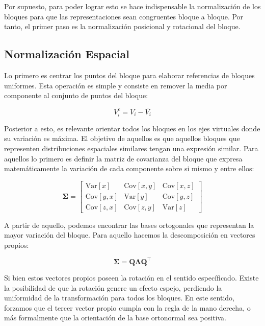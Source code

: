     Por supuesto, para poder lograr esto se hace indispensable la normalización de los bloques para que las representaciones sean congruentes bloque a bloque. Por tanto, el primer paso es la normalización posicional y rotacional del bloque.

    \subsection{Normalización Espacial}
        Lo primero es centrar los puntos del bloque para elaborar referencias de bloques uniformes. Esta operación es simple y consiste en remover la media por componente al conjunto de puntos del bloque:

        \begin{equation}
            V_i^{c} = V_{i} - \bar{V_i}
        \end{equation}

        Posterior a esto, es relevante orientar todos los bloques en los ejes virtuales donde su variación es máxima. El objetivo de aquellos es que aquellos bloques que representen distribuciones espaciales similares tengan una expresión similar. Para aquellos lo primero es definir la matriz de covarianza del bloque que expresa matemáticamente la variación de cada componente sobre si mismo y entre ellos:

        \begin{equation}
            \mathbf{\Sigma} =
                \begin{bmatrix}
                \mathrm{Var}[x] & \mathrm{Cov}[x,y] & \mathrm{Cov}[x,z] \\
                \mathrm{Cov}[y,x] & \mathrm{Var}[y] & \mathrm{Cov}[y,z] \\
                \mathrm{Cov}[z,x] & \mathrm{Cov}[z,y] & \mathrm{Var}[z]
                \end{bmatrix}
        \end{equation}

        A partir de aquello, podemos encontrar las bases ortogonales que representan la mayor variación del bloque. Para aquello hacemos la descomposición en vectores propios:

        \begin{equation}
            \mathbf{\Sigma} = \mathbf{Q} \mathbf{\Lambda} \mathbf{Q}^\top
        \end{equation}

        Si bien estos vectores propios poseen la rotación en el sentido específicado. Existe la posibilidad de que la rotación genere un efecto espejo, perdiendo la uniformidad de la transformación para todos los bloques. En este sentido, forzamos que el tercer vector propio cumpla con la regla de la mano derecha, o más formalmente que la orientación de la base ortonormal sea positiva.

